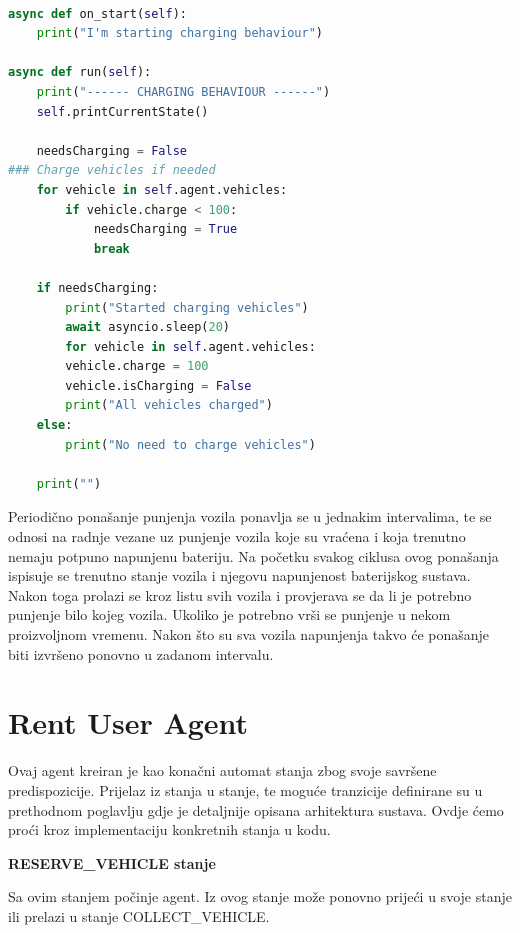 \documentclass{foi}
\begin{document}
\begin{lstlisting}[language=Python]

async def on_start(self):
	print("I'm starting charging behaviour")

async def run(self):
	print("------ CHARGING BEHAVIOUR ------")
	self.printCurrentState()

	needsCharging = False
### Charge vehicles if needed
	for vehicle in self.agent.vehicles:
		if vehicle.charge < 100:
			needsCharging = True
			break
	
	if needsCharging:
		print("Started charging vehicles")
		await asyncio.sleep(20)
		for vehicle in self.agent.vehicles:
		vehicle.charge = 100
		vehicle.isCharging = False
		print("All vehicles charged")
	else:
		print("No need to charge vehicles")
	
	print("")

\end{lstlisting}

Periodično ponašanje punjenja vozila ponavlja se u jednakim intervalima, te se odnosi na radnje vezane uz punjenje vozila koje su vraćena i koja trenutno nemaju potpuno napunjenu bateriju. Na početku svakog ciklusa ovog ponašanja ispisuje se trenutno stanje vozila i njegovu napunjenost baterijskog sustava. Nakon toga prolazi se kroz listu svih vozila i provjerava se da li je potrebno punjenje bilo kojeg vozila. Ukoliko je potrebno vrši se punjenje u nekom proizvoljnom vremenu. Nakon što su sva vozila napunjenja takvo će ponašanje biti izvršeno ponovno u zadanom intervalu.

\section{Rent User Agent}

Ovaj agent kreiran je kao konačni automat stanja zbog svoje savršene predispozicije. Prijelaz iz stanja u stanje, te moguće tranzicije definirane su u prethodnom poglavlju gdje je detaljnije opisana arhitektura sustava. Ovdje ćemo proći kroz implementaciju konkretnih stanja u kodu.

\begin{flushleft}\textbf{RESERVE\_VEHICLE stanje}\end{flushleft}

Sa ovim stanjem počinje agent. Iz ovog stanje može ponovno prijeći u svoje stanje ili prelazi u stanje COLLECT\_VEHICLE.
\end{document}
